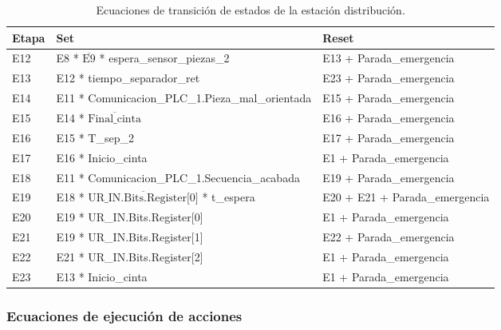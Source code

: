\begin{table}[H]
\begin{center}

\renewcommand{\arraystretch}{1.5}
\begin{tabular}{|M{1.5cm}|M{6cm}|M{6cm}|}
\hline
\textbf{Etapa} & 
\textbf{Set} & 
\textbf{Reset} \\
\hline
E12  &  E8 * $\overline{\text{E9}}$ * espera\_sensor\_piezas\_2 & E13 + Parada\_emergencia \\
\hline
E13  &  E12 * tiempo\_separador\_ret & E23 + Parada\_emergencia \\
\hline
E14  &  E11 *  Comunicacion\_PLC\_1.Pieza\_mal\_orientada & E15 + Parada\_emergencia \\
\hline
E15  &  E14 * $\overline{\text{Final\_cinta}}$ & E16 + Parada\_emergencia \\
\hline
E16  &  E15 * T\_sep\_2 & E17 + Parada\_emergencia \\
\hline
E17  &  E16 * Inicio\_cinta & E1 + Parada\_emergencia \\
\hline
E18  &  E11 *  Comunicacion\_PLC\_1.Secuencia\_acabada & E19 + Parada\_emergencia \\
\hline
E19  &  E18 * $\overline{\text{UR\_IN.Bits.Register[0]}}$  * t\_espera & E20 + E21 + Parada\_emergencia \\
\hline
E20  &  E19 * UR\_IN.Bits.Register[0] & E1 + Parada\_emergencia \\
\hline
E21  &  E19 * UR\_IN.Bits.Register[1] & E22 + Parada\_emergencia \\
\hline
E22  &  E21 * UR\_IN.Bits.Register[2] & E1 + Parada\_emergencia \\
\hline
E23  &  E13 * Inicio\_cinta & E1 + Parada\_emergencia \\
\hline

\end{tabular}

\caption{Ecuaciones de transición de estados de la estación distribución.}
\label{cuadro:transiciones_distribucion_2}
\end{center}
\end{table}

\subsubsection{Ecuaciones de ejecución de acciones}

